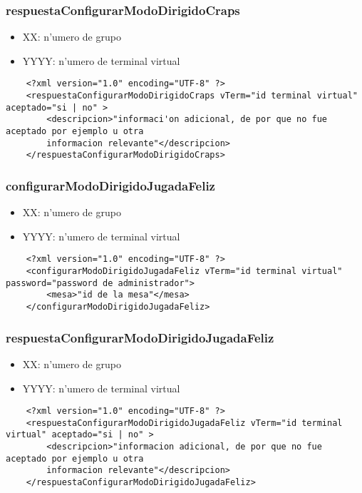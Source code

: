 \subsubsection{respuestaConfigurarModoDirigidoCraps}
 
\begin{itemize}
    \item{XX: n'umero de grupo}
    \item{YYYY: n'umero de terminal virtual}
\end{itemize}

\begin{verbatim}
    <?xml version="1.0" encoding="UTF-8" ?>
    <respuestaConfigurarModoDirigidoCraps vTerm="id terminal virtual" aceptado="si | no" >
        <descripcion>"informaci'on adicional, de por que no fue aceptado por ejemplo u otra
        informacion relevante"</descripcion>
    </respuestaConfigurarModoDirigidoCraps>
\end{verbatim}


\subsubsection{configurarModoDirigidoJugadaFeliz}
 
\begin{itemize}
    \item{XX: n'umero de grupo}
    \item{YYYY: n'umero de terminal virtual}
\end{itemize}


\begin{verbatim}
    <?xml version="1.0" encoding="UTF-8" ?>
    <configurarModoDirigidoJugadaFeliz vTerm="id terminal virtual" password="password de administrador">
        <mesa>"id de la mesa"</mesa>
    </configurarModoDirigidoJugadaFeliz>
\end{verbatim}


\subsubsection{respuestaConfigurarModoDirigidoJugadaFeliz}
 
\begin{itemize}
    \item{XX: n'umero de grupo}
    \item{YYYY: n'umero de terminal virtual}
\end{itemize}

\begin{verbatim}
    <?xml version="1.0" encoding="UTF-8" ?>
    <respuestaConfigurarModoDirigidoJugadaFeliz vTerm="id terminal virtual" aceptado="si | no" >
        <descripcion>"informacion adicional, de por que no fue aceptado por ejemplo u otra
        informacion relevante"</descripcion>
    </respuestaConfigurarModoDirigidoJugadaFeliz>
\end{verbatim}
